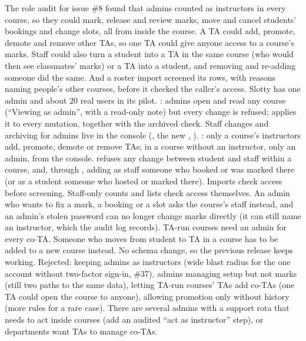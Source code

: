   {The role audit for issue \#8 found that admins counted as instructors in every course, so they
   could mark, release and review marks, move and cancel students' bookings and change slots, all
   from inside the course. A TA could add, promote, demote and remove other TAs, so one TA could
   give anyone access to a course's marks. Staff could also turn a student into a TA in the same
   course (who would then see classmates' marks) or a TA into a student, and removing and
   re-adding someone did the same. And a roster import screened its rows, with reasons naming
   people's other courses, before it checked the caller's access. Slotty has one admin and about
   20 real users in its pilot.}
  {: admins open and read any course (``Viewing as admin'', with a
   read-only note) but every change is refused;  applies it to every
   mutation, together with the archived check. Staff changes and archiving for admins live in
   the console (, the new , ).
   : only a course's instructors add, promote, demote or remove TAs; in a course
   without an instructor, only an admin, from the console.  refuses any change
   between student and staff within a course, and, through , adding as staff
   someone who booked or was marked there (or as a student someone who hosted or marked there).
   Imports check access before screening. Staff-only counts and lists check access themselves.}
  {An admin who wants to fix a mark, a booking or a slot asks the course's staff instead, and an
   admin's stolen password can no longer change marks directly (it can still name an instructor,
   which the audit log records). TA-run courses need an admin for every co-TA. Someone who moves
   from student to TA in a course has to be added to a new course instead. No schema change, so
   the previous release keeps working. Rejected: keeping admins as instructors (wide blast radius
   for the one account without two-factor sign-in, \#37), admins managing setup but not marks
   (still two paths to the same data), letting TA-run courses' TAs add co-TAs (one TA could open
   the course to anyone), allowing promotion only without history (more rules for a rare case).}
  {There are several admins with a support rota that needs to act inside courses (add an audited
   ``act as instructor'' step), or departments want TAs to manage co-TAs.}

